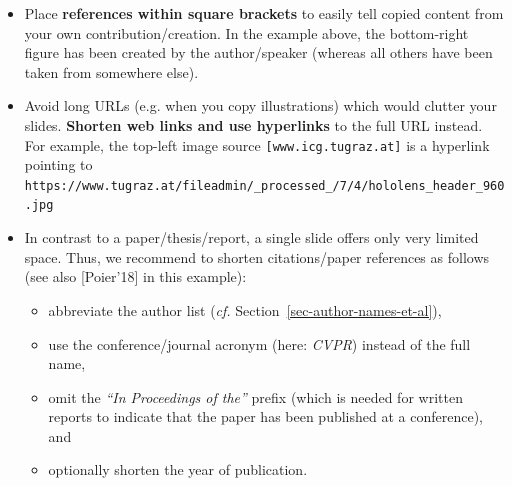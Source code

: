 \documentclass[11pt,a4paper]{article}
\begin{document}
\begin{goodexample}
  \label{ex-slide1}
  \begin{figure}[H]
    \centering%
    {%
      \setlength{\fboxsep}{0pt}%
      \setlength{\fboxrule}{2pt}%
    }
  \end{figure}
  
  \begin{itemize}[leftmargin=6pt]
    \item Place \textbf{references within square brackets} to easily tell copied content from your own contribution/creation. In the example above, the bottom-right figure has been created by the author/speaker (whereas all others have been taken from somewhere else).
    \item Avoid long URLs (e.g. when you copy illustrations) which would clutter your slides. \textbf{Shorten web links and use hyperlinks} to the full URL instead. For example, the top-left image source {\scriptsize\texttt{[www.icg.tugraz.at]}} is a hyperlink pointing to {\scriptsize\texttt{https://www.tugraz.at/fileadmin/\_processed\_/7/4/hololens\_header\_960.jpg}}
    \item In contrast to a paper/thesis/report, a single slide offers only very limited space. Thus, we recommend to shorten citations/paper references as follows (see also {\scriptsize[Poier'18]} in this example):
    \begin{itemize}[leftmargin=12pt]
      \item abbreviate the author list (\emph{cf.} Section~\ref{sec-author-names-et-al}),
      \item use the conference/journal acronym (here: \emph{CVPR}) instead of the full name,
      \item omit the \emph{``In Proceedings of the''} prefix (which is needed for written reports to indicate that the paper has been published at a conference), and
      \item optionally shorten the year of publication.
    \end{itemize}
  \end{itemize}
\end{goodexample}
\end{document}
